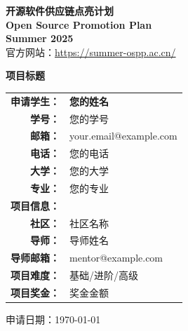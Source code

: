 \documentclass[a4paper,12pt]{article}
\makeatletter
\newcommand{\studentname}{您的姓名}
\newcommand{\studentid}{您的学号}
\newcommand{\studentemail}{your.email@example.com}
\newcommand{\studentphone}{您的电话}
\newcommand{\studentuniversity}{您的大学}
\newcommand{\studentmajor}{您的专业}
\newcommand{\projecttitle}{项目标题}
\newcommand{\communityname}{社区名称}
\newcommand{\mentorname}{导师姓名}
\newcommand{\mentoremail}{mentor@example.com}
\newcommand{\projectdifficulty}{基础/进阶/高级}
\newcommand{\projectreward}{奖金金额}
\makeatother
\begin{document}
\begin{titlepage}
    \centering
    
    \vspace{0.5cm}
    
    
    {\Huge \textcolor{osppblue}{\textbf{开源软件供应链点亮计划}}} \\
    \vspace{0.3cm}
    {\LARGE \textcolor{osppblue}{\textbf{Open Source Promotion Plan}}} \\
    \vspace{0.2cm}
    {\Large \textcolor{osppgray}{\textbf{Summer 2025}}} \\
    \vspace{0.3cm}
    {\small \textcolor{osppgray}{官方网站：\url{https://summer-ospp.ac.cn/}}}
    
    \vspace{2cm}
    
    {\huge \textcolor{osppdark}{\textbf{\projecttitle}}}
    
    \vspace{1.5cm}
    
    \begin{tabular}{rl}
        \textbf{\textcolor{osppblue}{申请学生：}} & \textbf{\studentname} \\[0.3cm]
        \textbf{学号：} & \studentid \\[0.1cm]
        \textbf{邮箱：} & \studentemail \\[0.1cm]
        \textbf{电话：} & \studentphone \\[0.1cm]
        \textbf{大学：} & \studentuniversity \\[0.1cm]
        \textbf{专业：} & \studentmajor \\[0.5cm]
        \textbf{\textcolor{osppblue}{项目信息：}} & \\[0.3cm]
        \textbf{社区：} & \communityname \\[0.1cm]
        \textbf{导师：} & \mentorname \\[0.1cm]
        \textbf{导师邮箱：} & \mentoremail \\[0.1cm]
        \textbf{项目难度：} & \projectdifficulty \\[0.1cm]
        \textbf{项目奖金：} & \projectreward \\
    \end{tabular}
    
    \vfill
    
    {\large \textcolor{osppgray}{申请日期：\today}}
    
\end{titlepage}
\end{document}
